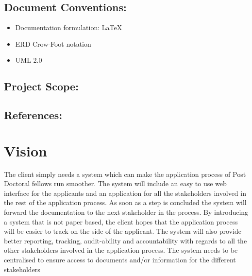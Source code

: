 \documentclass[12pt]{article}
\begin{document}
		\subsection{Document Conventions:}
		\vspace{0.1in}
		\begin{itemize}
			\item Documentation formulation: LaTeX
			\item ERD Crow-Foot notation
			\item UML 2.0
		\end{itemize}
	
		\vspace{0.2in}
	
		\subsection{Project Scope:}
		\vspace{0.2in}		
		
		\vspace{0.2in}
	
		\subsection{References:}
		\vspace{0.1in}
			
	
	\vspace{0.5in}
	
	\newpage
	\section{Vision} %
	\vspace{0.2in}
	The client simply needs a system which can make the application process of Post Doctoral fellows run smoother. The system will include an easy to use web interface for the applicants and an application for all the stakeholders involved in the rest of the application process. As soon as a step is concluded the system will forward the documentation to the next stakeholder in the process. By introducing a system that is not paper based, the client hopes that the application process will be easier to track on the side of the applicant. The system will also provide better reporting, tracking, audit-ability and accountability with regards to all the other stakeholders involved in the application process. The system needs to be centralised to ensure access to documents and/or information for the different stakeholders
	\vspace{0.5in}
	
\end{document}
